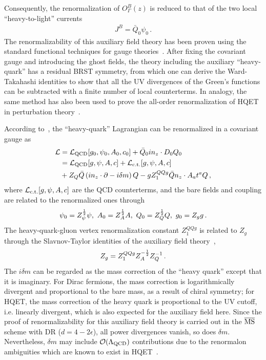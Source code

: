 \documentclass[aps,rmp,reprint,amsmath,amssymb,graphicx,longbibliography]{revtex4-1} %
\newcommand{\MS}{{\overline{\rm MS}}}
\newcommand{\beq}{\begin{eqnarray}}
\newcommand{\eeq}{\end{eqnarray}}
\newcommand{\nn}{\nonumber}
\begin{document}
Consequently, the renormalization of $O^B_{\Gamma}(z)$ is reduced to that of the two local ``heavy-to-light'' currents
\begin{align}
	J^B = \bar{Q}_0 \psi_0\,.
\end{align}
The renormalizability of this auxiliary field theory has been proven using the standard functional techniques for gauge theories~\cite{Dorn:1986dt}. After fixing the covariant gauge and introducing the ghost fields, the theory including the auxiliary ``heavy-quark'' has a residual BRST symmetry, from which one can derive the Ward-Takahashi identities to show that all the UV divergences of the Green's functions can be subtracted with a finite number of local counterterms. In analogy, the same method has also been used to prove the all-order renormalization of HQET in perturbation theory~\cite{Bagan:1993zv}.

According to~\cite{Dorn:1986dt}, the ``heavy-quark'' Lagrangian can be renormalized in a covariant gauge as
\begin{align}\label{eq:auxl}
	{\cal L} &= {\cal L}_{\rm QCD}[g_0,\psi_0,A_0,c_0] + \bar{Q}_0in_z\cdot D_0 Q_0\nn\\
	&={\cal L}_{\rm QCD}[g,\psi,A,c] +  {\cal L}_{\rm c.t.}[g,\psi,A,c] \nn\\
	& +  Z_Q\bar{Q}\left(in_z\cdot \partial - i\delta m\right) Q - g Z_{1}^{QQg}\bar{Q}n_z\cdot A_at^aQ\,,
\end{align}
where ${\cal L}_{\rm c.t.}[g,\psi,A,c]$ are the QCD counterterms, and the bare fields and coupling are related to the renormalized ones through
\begin{align}
	\psi_0=Z_\psi^{1\over2}\psi, \ A_0 = Z_A^{1\over2} A,\ Q_0 = Z_Q^{1\over2} Q,\ g_0=Z_gg\,.
\end{align}
The heavy-quark-gluon vertex renormalization constant $Z_1^{QQg}$ is related to $Z_g$ through the Slavnov-Taylor identities of the auxiliary field theory~\cite{Dorn:1986dt},
\beq
Z_g= Z_1^{QQg} Z_A^{-{1\over2}}Z_Q^{-1}	\,.
\eeq
The $i\delta m$ can be regarded as the mass correction of the ``heavy quark'' except that it is imaginary.
For Dirac fermions, the mass correction is logarithmically divergent and proportional to the bare mass, as a result of chiral symmetry; for HQET, the mass correction of the heavy quark is proportional to the UV cutoff, i.e. linearly divergent, which is also expected for the auxiliary field here. Since the proof of renormalizability for this auxiliary field theory is carried out in the $\MS$ scheme with DR ($d=4-2\epsilon$), all power divergences vanish, so does $\delta m$.
Nevertheless, $\delta m$ may include ${\cal O}(\Lambda_{\text{QCD}})$ contributions due to the renormalon ambiguities which are known to exist in HQET~\cite{Bigi:1994em,Beneke:1994sw}.
\end{document}
